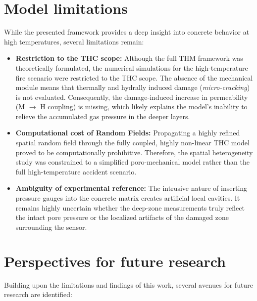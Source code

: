 \section{Model limitations}
While the presented framework provides a deep insight into concrete behavior at high temperatures, several limitations remain:

\begin{itemize}
    \item \textbf{Restriction to the THC scope:} Although the full THM framework was theoretically formulated, the numerical simulations for the high-temperature fire scenario were restricted to the THC scope. The absence of the mechanical module means that thermally and hydrally induced damage (\emph{micro-cracking}) is not evaluated. Consequently, the damage-induced increase in permeability (M $\rightarrow$ H coupling) is missing, which likely explains the model's inability to relieve the accumulated gas pressure in the deeper layers.
    \item \textbf{Computational cost of Random Fields:} Propagating a highly refined spatial random field through the fully coupled, highly non-linear THC model proved to be computationally prohibitive. Therefore, the spatial heterogeneity study was constrained to a simplified poro-mechanical model rather than the full high-temperature accident scenario.
    \item \textbf{Ambiguity of experimental reference:} The intrusive nature of inserting pressure gauges into the concrete matrix creates artificial local cavities. It remains highly uncertain whether the deep-zone measurements truly reflect the intact pore pressure or the localized artifacts of the damaged zone surrounding the sensor.
\end{itemize}

\section{Perspectives for future research}
Building upon the limitations and findings of this work, several avenues for future research are identified:

